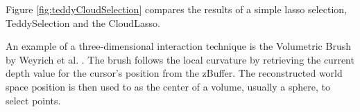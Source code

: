 Figure \ref{fig:teddyCloudSelection} compares the results of a simple lasso selection, TeddySelection and the CloudLasso. 

\par

An example of a three-dimensional interaction technique is the Volumetric Brush by Weyrich et al. \cite{weyrich2004post}. The brush follows the local curvature by retrieving the current depth value for the cursor's position from the zBuffer. The reconstructed world space position is then used to as the center of a volume, usually a sphere, to select points. 


